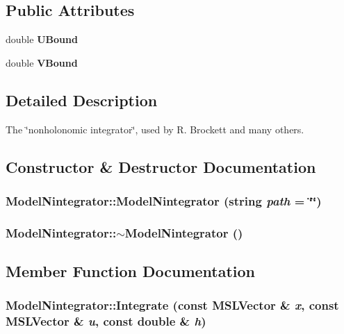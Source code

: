 \subsection*{Public Attributes}
\begin{CompactItemize}
\item 
double {\bf UBound}
\item 
double {\bf VBound}
\end{CompactItemize}


\subsection{Detailed Description}
The \char`\"{}nonholonomic integrator\char`\"{}, used by R. Brockett and many others.



\subsection{Constructor \& Destructor Documentation}
\subsubsection{\setlength{\rightskip}{0pt plus 5cm}Model\-Nintegrator::Model\-Nintegrator (string {\em path} = \char`\"{}\char`\"{})}\label{classModelNintegrator_a0}


\subsubsection{\setlength{\rightskip}{0pt plus 5cm}Model\-Nintegrator::$\sim$Model\-Nintegrator ()\hspace{0.3cm}{\tt  [inline, virtual]}}\label{classModelNintegrator_a1}




\subsection{Member Function Documentation}
\subsubsection{ Model\-Nintegrator::Integrate (const {\bf MSLVector} \& {\em x}, const {\bf MSLVector} \& {\em u}, const double \& {\em h})\hspace{0.3cm}{\tt  [virtual]}}\label{classModelNintegrator_a3}


